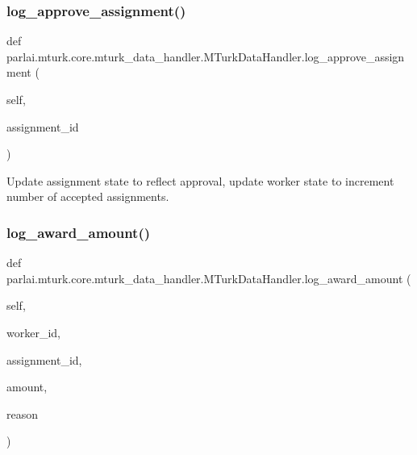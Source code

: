 \subsubsection{\texorpdfstring{log\+\_\+approve\+\_\+assignment()}{log\_approve\_assignment()}}
{\footnotesize\ttfamily def parlai.\+mturk.\+core.\+mturk\+\_\+data\+\_\+handler.\+M\+Turk\+Data\+Handler.\+log\+\_\+approve\+\_\+assignment (\begin{DoxyParamCaption}\item[{}]{self,  }\item[{}]{assignment\+\_\+id }\end{DoxyParamCaption})}

\begin{DoxyVerb}Update assignment state to reflect approval, update worker state to increment
number of accepted assignments.
\end{DoxyVerb}
 \mbox{\label{classparlai_1_1mturk_1_1core_1_1mturk__data__handler_1_1MTurkDataHandler_a399c5d70b0e2509b061f0d0f627a3f01}} 
\subsubsection{\texorpdfstring{log\+\_\+award\+\_\+amount()}{log\_award\_amount()}}
{\footnotesize\ttfamily def parlai.\+mturk.\+core.\+mturk\+\_\+data\+\_\+handler.\+M\+Turk\+Data\+Handler.\+log\+\_\+award\+\_\+amount (\begin{DoxyParamCaption}\item[{}]{self,  }\item[{}]{worker\+\_\+id,  }\item[{}]{assignment\+\_\+id,  }\item[{}]{amount,  }\item[{}]{reason }\end{DoxyParamCaption})}

